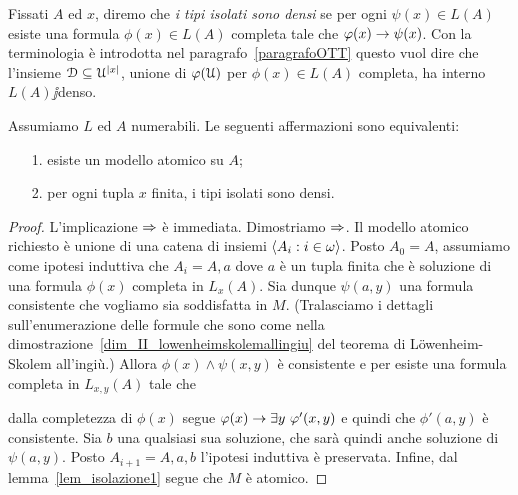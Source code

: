Fissati $A$ ed $x$, diremo che \emph{i tipi isolati sono densi\/} se  per ogni $\psi(x)\in L(A)$ esiste una formula $\phi(x)\in L(A)$ completa tale che $\varphi(x)\rightarrow\psi(x)$. Con la terminologia \`e introdotta nel paragrafo~\ref{paragrafoOTT} questo vuol dire che l'insieme $\EuScript D\subseteq\EuScript U^{|x|}$, unione di $\varphi(\EuScript U)$ per $\phi(x)\in L(A)$ completa, ha interno $L(A)\jj$denso.

\begin{proposition}\label{prop_atomico_isolatidensi}
Assumiamo $L$ ed $A$ numerabili. Le seguenti affermazioni sono equivalenti:
\begin{itemize}
\item[1.] esiste un modello atomico su $A$;
\item[2.] per ogni tupla $x$ finita, i tipi isolati sono densi. 
\end{itemize}
\end{proposition}

\begin{proof}
L'implicazione $\Rightarrow$ \`e immediata. Dimostriamo $\Rightarrow$. Il modello atomico richiesto \`e unione di una catena di insiemi $\langle A_i:i\in\omega\rangle$. Posto $A_0=A$, assumiamo come ipotesi induttiva che $A_i=A,a$ dove $a$ \`e un tupla finita che \`e soluzione di una formula $\phi(x)$ completa in $L_x(A)$.  Sia dunque $\psi(a,y)$ una formula consistente che vogliamo sia soddisfatta in $M$. (Tralasciamo i dettagli sull'enumerazione delle formule che sono come nella dimostrazione~\ref{dim_II_lowenheimskolemallingiu} del teorema di L\"owenheim-Skolem all'ingi\`u.) Allora $\phi(x)\wedge\psi(x,y)$ \`e consistente e per  esiste una formula completa in $L_{x,y}(A)$ tale che


dalla completezza di $\phi(x)$ segue $\varphi(x)\rightarrow\exists y\ \varphi'(x,y)$ e quindi che $\phi'(a,y)$ \`e consistente. Sia $b$ una qualsiasi sua soluzione, che sar\`a quindi anche soluzione di $\psi(a,y)$. Posto $A_{i+1}=A,a,b$ l'ipotesi induttiva \`e preservata. Infine, dal lemma~\ref{lem_isolazione1} segue  che $M$ \`e atomico.
\end{proof}



